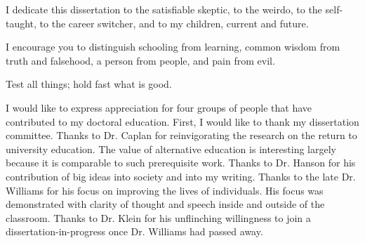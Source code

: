 \documentclass[11 pt]{report}
\begin{document}
\author{John Vandivier}






\titlepage
\copyrightpage
\dedicationpage

\noindent I dedicate this dissertation
to the satisfiable skeptic,
to the weirdo,
to the self-taught,
to the career switcher,
and to my children, current and future.

\bigskip

\noindent I encourage you to distinguish schooling from learning,
common wisdom from truth and falsehood,
a person from people,
and pain from evil.

\bigskip

\noindent Test all things; hold fast what is good.


\acknowledgementspage

\noindent I would like to express appreciation for four groups of people that have contributed to my doctoral education.
First, I would like to thank my dissertation committee.
Thanks to Dr. Caplan for reinvigorating the research on the return to university education.
The value of alternative education is interesting largely because it is comparable to such prerequisite work.
Thanks to Dr. Hanson for his contribution of big ideas into society and into my writing.
Thanks to the late Dr. Williams for his focus on improving the lives of individuals.
His focus was demonstrated with clarity of thought and speech inside and outside of the classroom.
Thanks to Dr. Klein for his unflinching willingness to join a dissertation-in-progress once Dr. Williams had passed away.
\end{document}
